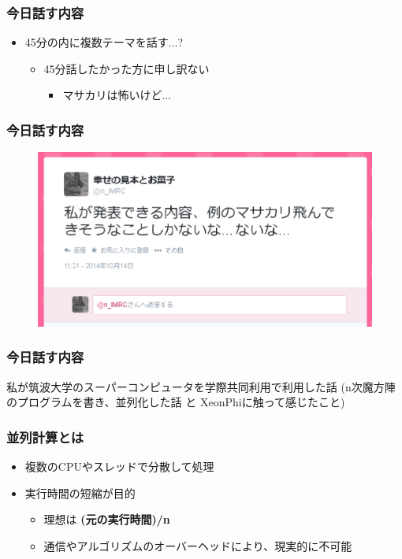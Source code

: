 \documentclass[dvipdfmx,20pt,notheorems,t]{beamer}
\begin{document}
\begin{frame}\frametitle{今日話す内容}
\begin{itemize}
\item 45分の内に複数テーマを話す...?
\begin{itemize}
\item 45分話したかった方に申し訳ない
\begin{itemize}
\item マサカリは怖いけど...
\end{itemize}
\end{itemize}
\end{itemize}
\end{frame}
\begin{frame}\frametitle{今日話す内容}
\begin{figure}[htb]
\centering
\includegraphics[width=\textwidth]{2.eps}
\end{figure}
\end{frame}
\begin{frame}\frametitle{今日話す内容}
\centering
\large
\vspace*{\fill}
私が筑波大学のスーパーコンピュータを学際共同利用で利用した話
(n次魔方陣のプログラムを書き、並列化した話 と XeonPhiに触って感じたこと)
\vspace*{\fill}
\end{frame}

\begin{frame}\frametitle{並列計算とは}
\begin{itemize}
\item 複数のCPUやスレッドで分散して処理
\item 実行時間の短縮が目的
\begin{itemize}
\item 理想は \textbf{(元の実行時間)/n}
\item 通信やアルゴリズムのオーバーヘッドにより、現実的に不可能
\end{itemize}
\end{itemize}
\end{frame}
\end{document}

